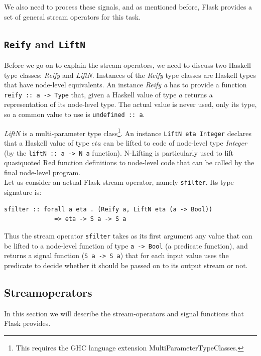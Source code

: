 \documentclass[a4paper, oneside, final]{memoir}
\begin{document}
We also need to process these signals, and as mentioned before, Flask
provides a set of general stream operators for this task.


\subsection{\texttt{Reify} and \texttt{LiftN}}
Before we go on to explain the stream operators, we need to discuss
two Haskell type classes: \textit{Reify} and \textit{LiftN}.
Instances of the \textit{Reify} type classes are Haskell types that
have node-level equivalents. An instance \textit{Reify a} has to
provide a function \texttt{reify :: a -> Type} that, given a Haskell
value of type $a$ returns a representation of its node-level type.
The actual value is never used, only its type, so a common value to
use is \texttt{undefined :: a}.

\textit{LiftN} is a multi-parameter type class\footnote{This requires
  the GHC language extension MultiParameterTypeClasses.}. An instance
\texttt{LiftN eta Integer} declares that a Haskell value of type $eta$
can be lifted to code of node-level type \textit{Integer} (by the
\texttt{liftN :: a -> N a} function).  N-Lifting is particularly used to
lift quasiquoted Red function definitions to node-level code that can
be called by the final node-level program.\\

\noindent
Let us consider an actual Flask stream operator, namely
\texttt{sfilter}. Its type signature is:

\begin{verbatim}
sfilter :: forall a eta . (Reify a, LiftN eta (a -> Bool))
              => eta -> S a -> S a
\end{verbatim}

Thus the stream operator \texttt{sfilter} takes as its first argument
any value that can be lifted to a node-level function of type
\texttt{a -> Bool} (a predicate function), and returns a signal
function (\texttt{S a -> S a}) that for each input value uses the
predicate to decide whether it should be passed on to its output
stream or not.

\newpage
\subsection{Streamoperators}
\label{sec:streamoperators}
In this section we will describe the stream-operators and signal
functions that Flask provides.
\end{document}
